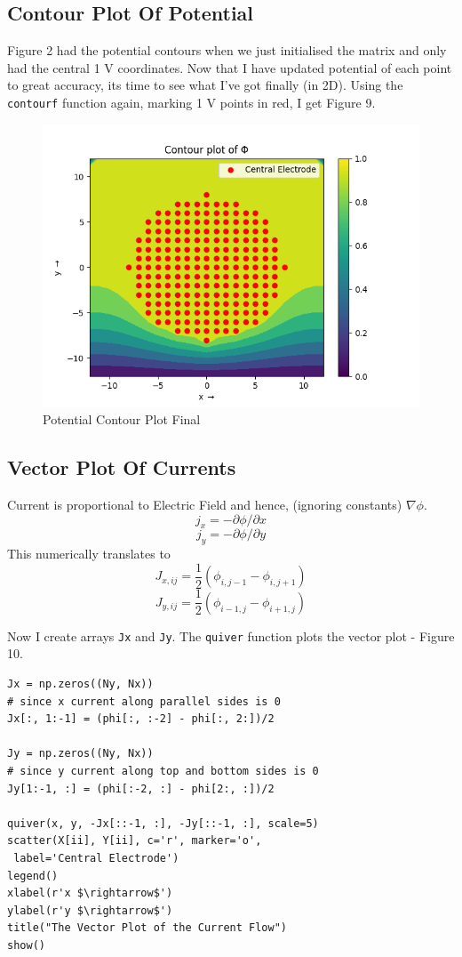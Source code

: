 \documentclass[11pt, a4paper]{article}
\begin{document}
\subsection{Contour Plot Of Potential}
Figure 2 had the potential contours when we just initialised the matrix and only had the central 1 V coordinates. Now that I have updated potential of each point to great accuracy, its time to see what I've got finally (in 2D). Using the \texttt{contourf} function again, marking 1 V points in red, I get Figure 9. 

\begin{figure}[!tbh]
   	\centering
  \includegraphics[scale=0.5]{Q5.png} 
    \caption{Potential Contour Plot Final}
   	\label{fig:contour potential final)}
   \end{figure} 
   
\subsection{Vector Plot Of Currents}
 Current is proportional to Electric Field and hence, (ignoring constants) $\nabla \phi$.
$$j_x = -{\partial \phi}/{\partial x}$$
$$j_y = -\partial\phi/\partial y$$
This numerically translates to 
$$J_{x,ij} = \frac{1}{2}(\phi_{i,j-1}-\phi_{i,j+1})$$
$$J_{y,ij} = \frac{1}{2}(\phi_{i-1,j}-\phi_{i+1,j})$$

Now I create arrays \texttt{Jx} and \texttt{Jy}. The \texttt{quiver} function plots the vector plot - Figure 10.

\begin{verbatim}
Jx = np.zeros((Ny, Nx))  
# since x current along parallel sides is 0
Jx[:, 1:-1] = (phi[:, :-2] - phi[:, 2:])/2

Jy = np.zeros((Ny, Nx))  
# since y current along top and bottom sides is 0
Jy[1:-1, :] = (phi[:-2, :] - phi[2:, :])/2

quiver(x, y, -Jx[::-1, :], -Jy[::-1, :], scale=5)
scatter(X[ii], Y[ii], c='r', marker='o',
 label='Central Electrode')
legend()
xlabel(r'x $\rightarrow$')
ylabel(r'y $\rightarrow$')
title("The Vector Plot of the Current Flow")
show()
\end{verbatim}
\end{document}
